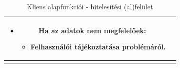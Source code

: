 \documentclass[twoside, a4paper, 12pt]{article}
\begin{document}
\begin{longtable}[c]{|c|p{14cm}|}
\begin{itemize}
		\item Ha az adatok nem megfelelőek:
		\begin{itemize}
			\item Felhasználói tájékoztatása problémáról.
		\end{itemize}
	\end{itemize}
	\\
	\hline
	
	\caption{Kliens alapfunkciói - hitelesítési (al)felület}
	\label{userStories:client:authentication}\\
\end{longtable}

\end{document}

